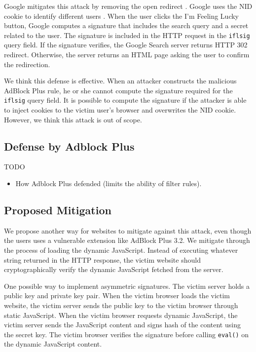 \documentclass[conference]{IEEEtran}
\begin{document}
Google mitigates this attack by removing the open redirect \cite{superuser_ifl_redir_notice}. Google uses the NID cookie to identify different users \cite{google_cookies}. When the user clicks the I'm Feeling Lucky button, Google computes a signature that includes the search query and a secret related to the user. The signature is included in the HTTP request in the \lstinline{iflsig} query field. If the signature verifies, the Google Search server returns HTTP 302 redirect. Otherwise, the server returns an HTML page asking the user to confirm the redirection.

We think this defense is effective. When an attacker constructs the malicious AdBlock Plus rule, he or she cannot compute the signature required for the \lstinline{iflsig} query field. It is possible to compute the signature if the attacker is able to inject cookies to the victim user's browser and overwrites the NID cookie. However, we think this attack is out of scope.

\subsection{Defense by Adblock Plus}

TODO

\begin{itemize}
\item How Adblock Plus defended (limits the ability of filter rules).
\end{itemize}

\subsection{Proposed Mitigation}

We propose another way for websites to mitigate against this attack, even though the users uses a vulnerable extension like AdBlock Plus 3.2. We mitigate through the process of loading the dynamic JavaScript. Instead of executing whatever string returned in the HTTP response, the victim website should cryptographically verify the dynamic JavaScript fetched from the server.

One possible way to implement asymmetric signatures. The victim server holds a public key and private key pair. When the victim browser loads the victim website, the victim server sends the public key to the victim browser through static JavaScript. When the victim browser requests dynamic JavaScript, the victim server sends the JavaScript content and signs hash of the content using the secret key. The victim browser verifies the signature before calling \lstinline{eval()} on the dynamic JavaScript content.
\end{document}

